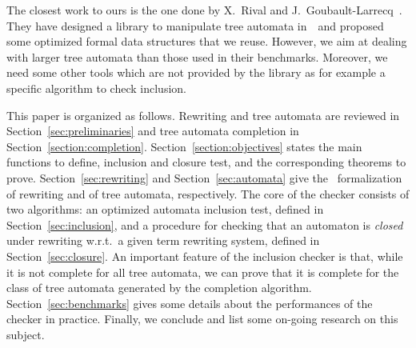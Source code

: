 The closest work to ours is the one done by X.~Rival and
J.~Goubault-Larrecq~\cite{RivalGL-TPHOL01}. They have designed a library to
manipulate tree automata in~\coq\ and proposed some optimized formal data
structures that we reuse. However, we aim at dealing with larger tree automata
than those used in their benchmarks. Moreover, we need some other tools which
are not provided by the library as for example a specific algorithm to check
inclusion. 

This paper is organized as follows. Rewriting and tree automata are reviewed in
Section~\ref{sec:preliminaries} and tree automata completion in
Section~\ref{section:completion}. Section~\ref{section:objectives} states the main
functions to define, inclusion and closure test, and the corresponding theorems
to prove. Section~\ref{sec:rewriting} and Section~\ref{sec:automata} give the
\coq\ formalization of rewriting and of tree automata,
respectively. 
The core of the checker consists of two algorithms: an optimized automata inclusion
test, defined in Section~\ref{sec:inclusion}, and a procedure for
checking that an automaton is \emph{closed} under rewriting w.r.t.~a
given term rewriting system, defined in  Section~\ref{sec:closure}. 
An important feature of the inclusion checker is that, while it is
not complete for all tree automata, we can  prove that it is complete
for the class of tree automata generated by the completion algorithm. 
Section~\ref{sec:benchmarks} gives some details about the performances of the
checker in practice. Finally, we conclude and list some on-going research on this
subject. 

